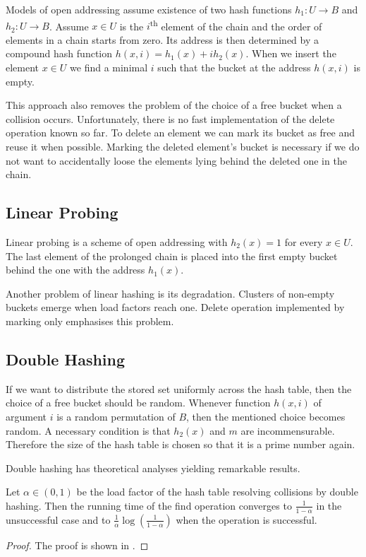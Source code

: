 Models of open addressing assume existence of two hash functions $h_1: U \rightarrow B$ and $h_2: U \rightarrow B$. Assume $x \in U$ is the $i$\textsuperscript{th} element of the chain and the order of elements in a chain starts from zero. Its address is then determined by a compound hash function $h(x, i) = h_1(x) + i h_2(x)$. When we insert the element $x \in U$ we find a minimal $i$ such that the bucket at the address $h(x, i)$ is empty.

This approach also removes the problem of the choice of a free bucket when a collision occurs. Unfortunately, there is no fast implementation of the delete operation known so far. To delete an element we can mark its bucket as free and reuse it when possible. Marking the deleted element's bucket is necessary if we do not want to accidentally loose the elements lying behind the deleted one in the chain.

\subsection{Linear Probing}
Linear probing is a scheme of open addressing with $h_2(x) = 1$ for every $x \in U$. The last element of the prolonged chain is placed into the first empty bucket behind the one with the address $h_1(x)$.

Another problem of linear hashing is its degradation. Clusters of non-empty buckets emerge when load factors reach one. Delete operation implemented by marking only emphasises this problem.

\subsection{Double Hashing}
If we want to distribute the stored set uniformly across the hash table, then the choice of a free bucket should be random. Whenever function $h(x, i)$ of argument $i$ is a random permutation of $B$, then the mentioned choice becomes random. A necessary condition is that $h_2(x)$ and $m$ are incommensurable. Therefore the size of the hash table is chosen so that it is a prime number again. 

Double hashing has theoretical analyses yielding remarkable results.
\begin{theorem}
Let $\alpha \in (0, 1)$ be the load factor of the hash table resolving collisions by double hashing. Then the running time of the find operation  converges to $\frac{1}{1 - \alpha}$ in the unsuccessful case and to $\frac{1}{\alpha}\log\left(\frac{1}{1 - \alpha}\right)$ when the operation is successful.
\end{theorem}
\begin{proof}
The proof is shown in \cite{DBLP:books/sp/Mehlhorn84}.
\end{proof}

